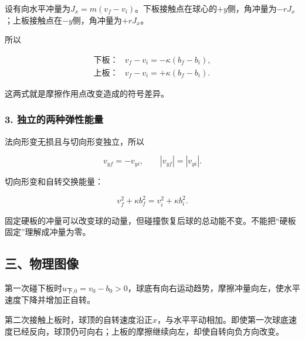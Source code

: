 \documentclass[12pt,a4paper,fontset=fandol]{ctexart}
\begin{document}
设有向水平冲量为\(J_x=m(v_f-v_i)\)。下板接触点在球心的\(+y\)侧，角冲量为\(-rJ_x\)；上板接触点在\(-y\)侧，角冲量为\(+rJ_x\)。

所以

\[
\begin{array}{ll}
\text{下板：}&v_f-v_i=-\kappa(b_f-b_i),\\
\text{上板：}&v_f-v_i=+\kappa(b_f-b_i).
\end{array}
\]

这两式就是摩擦作用点改变造成的符号差异。

\subsubsection{3.
独立的两种弹性能量}\label{ux72ecux7acbux7684ux4e24ux79cdux5f39ux6027ux80fdux91cf}

法向形变无损且与切向形变独立，所以

\[
v_{yf}=-v_{yi},\qquad |v_{yf}|=|v_{yi}|.
\]

切向形变和自转交换能量：

\[
v_f^2+\kappa b_f^2=v_i^2+\kappa b_i^2.
\]

固定硬板的冲量可以改变球的动量，但碰撞恢复后球的总动能不变。不能把``硬板固定''理解成冲量为零。

\subsection{三、物理图像}\label{ux4e09ux7269ux7406ux56feux50cf-2}

第一次碰下板时\(u_{\text{下,0}}=v_0-b_0>0\)，球底有向右运动趋势，摩擦冲量向左，使水平速度下降并增加正自转。

第二次接触上板时，球顶的自转速度沿正\(x\)，与水平平动相加。即使第一次球底速度已经反向，球顶仍可向右；上板的摩擦继续向左，却使自转向负方向改变。

\begin{center}
\begin{minipage}{\linewidth}
\centering\begingroup{}
\ifdim\wd\diagrambox>.88\linewidth
\sbox{\diagrambox}{\resizebox{.88\linewidth}{!}{\usebox{\diagrambox}}}\fi
\ifdim\ht\diagrambox>.38\textheight
\resizebox{!}{.38\textheight}{\usebox{\diagrambox}}
\else\usebox{\diagrambox}\fi
\par{}\endgroup\end{minipage}\end{center}
\end{document}
